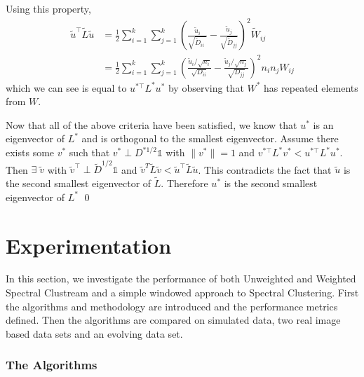 Using this property, 
\begin{align*}
  \tilde{u}^{\top} \tilde{L} \tilde{u} &= \frac{1}{2} \sum_{i = 1}^k \sum_{j = 1}^k \left( \frac{\tilde{u}_i}{\sqrt{\tilde{D}_{ii \phantom{j}}}} - \frac{\tilde{u}_j}{\sqrt{\tilde{D}_{jj}}}  \right)^2 \tilde{W}_{ij} \\
 &= \frac{1}{2} \sum_{i = 1}^k \sum_{j = 1}^k \left( \frac{\tilde{u}_i / \sqrt{n_i}}{\sqrt{D_{ii}}} - \frac{\tilde{u}_j / \sqrt{n_j}}{\sqrt{D_{jj}}} \right)^2 n_i n_j  W_{ij}
\end{align*}
which we can see is equal to $ u^{* \top}L^*u^*$ by observing that $W^*$ has repeated elements from $W$.

Now that all of the above criteria have been satisfied, we know that $u^*$ is an eigenvector of $L^*$ and is orthogonal to the smallest eigenvector. Assume there exists some $v^*$ such that $v^* \perp D^{* 1/2}\mathds{1}$ with $\|v^*\|=1$ and $v^{* \top}L^*v^* < u^{* \top}L^*u^*$. Then $\exists \; \tilde{v}$ with $\tilde{v}^{\top} \perp \tilde{D}^{1/2}\mathds{1}$ and $\tilde{v}^T \tilde{L} \tilde{v} < \tilde{u}^{\top} \tilde{L} \tilde{u}$. This contradicts the fact that $\tilde{u}$ is the second smallest eigenvector of $\tilde{L}$. Therefore $u^*$ is the second smallest eigenvector of $L^*$ \qed 

\section{Experimentation}
\label{sec:clustream_exp}

In this section, we investigate the performance of both Unweighted and Weighted Spectral Clustream and a simple windowed approach to Spectral Clustering. First the algorithms and methodology are introduced and the performance metrics defined. Then the algorithms are compared on simulated data, two real image based data sets and an evolving data set. 

\subsubsection{The Algorithms}


